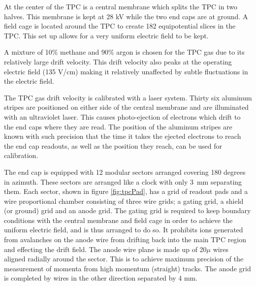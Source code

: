\documentclass[letterpaper, abstract = on,listof=totoc, bibliography=totoc]{scrreprt}
\begin{document}
At the center of the TPC is a central membrane which splits the TPC in two halves. This membrane is kept at 28 kV while the two end caps are at ground. A field cage is located around the TPC to create 182 equipotential slices in the TPC. This set up allows for a very uniform electric field to be kept.   

A mixture of 10$\%$ methane and $90\%$ argon is chosen for the TPC gas due to its relatively large drift velocity. This drift velocity also peaks at the operating electric field (135 V/cm) making it relatively unaffected by subtle fluctuations in the electric field.

The TPC gas drift velocity is calibrated with a laser system. Thirty six aluminum stripes are positioned on either side of the central membrane and are illuminated with an ultraviolet laser. This causes photo-ejection of electrons which drift to the end caps where they are read. The position of the aluminum stripes are known with such precision that the time it takes the ejected electrons to reach the end cap readouts, as well as the position they reach, can be used for calibration. 

The end cap is equipped with 12 modular sectors arranged covering 180 degrees in azimuth. These sectors are arranged like a clock with only 3~mm separating them. Each sector, shown in figure \ref{fig:tpcPad}, has a grid of readout pads and a wire proportional chamber consisting of three wire grids; a gating grid, a shield (or ground) grid and an anode grid. The gating grid is required to keep boundary conditions with the central membrane and field cage in order to achieve the uniform electric field, and is thus arranged to do so. It prohibits ions generated from avalanches on the anode wire from drifting back into the main TPC region and effecting the drift field. The anode wire plane is made up of 20$\mu$ wires aligned radially around the sector. This is to achieve maximum precision of the measurement of momenta from high momentum (straight) tracks. The anode grid is completed by wires in the other direction separated by 4 mm.
\end{document}
